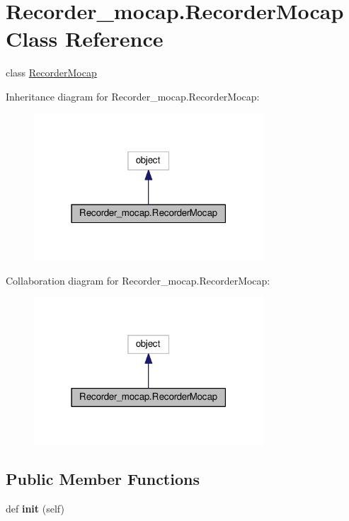 \hypertarget{classRecorder__mocap_1_1RecorderMocap}{}\section{Recorder\+\_\+mocap.\+Recorder\+Mocap Class Reference}
\label{classRecorder__mocap_1_1RecorderMocap}


class \hyperlink{classRecorder__mocap_1_1RecorderMocap}{Recorder\+Mocap}  




Inheritance diagram for Recorder\+\_\+mocap.\+Recorder\+Mocap\+:
\nopagebreak
\begin{figure}[H]
\begin{center}
\leavevmode
\includegraphics[width=243pt]{classRecorder__mocap_1_1RecorderMocap__inherit__graph}
\end{center}
\end{figure}


Collaboration diagram for Recorder\+\_\+mocap.\+Recorder\+Mocap\+:
\nopagebreak
\begin{figure}[H]
\begin{center}
\leavevmode
\includegraphics[width=243pt]{classRecorder__mocap_1_1RecorderMocap__coll__graph}
\end{center}
\end{figure}
\subsection*{Public Member Functions}
\begin{DoxyCompactItemize}
\item 
def {\bfseries init} (self)\hypertarget{classRecorder__mocap_1_1RecorderMocap_a9700ab49854d757e0d6c287f0e9f59ef}{}\label{classRecorder__mocap_1_1RecorderMocap_a9700ab49854d757e0d6c287f0e9f59ef}

\end{DoxyCompactItemize}
